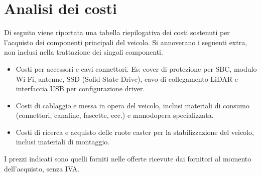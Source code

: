 \section{Analisi dei costi}
Di seguito viene riportata una tabella riepilogativa dei costi sostenuti per l'acquisto dei componenti principali del veicolo.
Si annoverano i seguenti extra, non inclusi nella trattazione dei singoli componenti.
\begin{itemize}
    \item Costi per accessori e cavi connettori. Es: cover di protezione per SBC, modulo Wi-Fi, antenne, SSD  (Solid-State Drive), cavo di collegamento LiDAR e interfaccia USB per configurazione driver.
    \item Costi di cablaggio e messa in opera del veicolo, inclusi materiali di consumo (connettori, canaline, fascette, ecc.) e manodopera specializzata.
    \item Costi di ricerca e acquisto delle ruote caster per la stabilizzazione del veicolo, inclusi materiali di montaggio.
\end{itemize}
I prezzi indicati sono quelli forniti nelle offerte ricevute dai fornitori al momento dell'acquisto, senza IVA.
